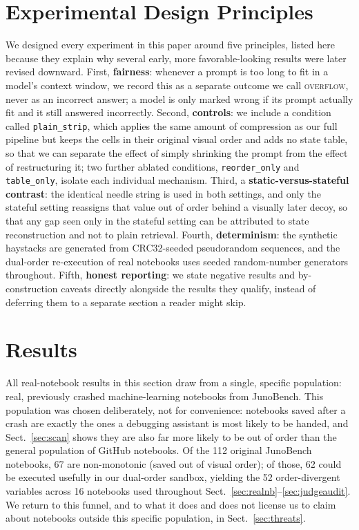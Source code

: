\documentclass[11pt]{article}
\begin{document}
\section{Experimental Design Principles}
We designed every experiment in this paper around five principles, listed
here because they explain why several early, more favorable-looking
results were later revised downward. First, \textbf{fairness}: whenever a
prompt is too long to fit in a model's context window, we record this as
a separate outcome we call \textsc{overflow}, never as an incorrect
answer; a model is only marked wrong if its prompt actually fit and it
still answered incorrectly. Second, \textbf{controls}: we include a
condition called \texttt{plain\_strip}, which applies the same amount of
compression as our full pipeline but keeps the cells in their original
visual order and adds no state table, so that we can separate the effect
of simply shrinking the prompt from the effect of restructuring it; two
further ablated conditions, \texttt{reorder\_only} and
\texttt{table\_only}, isolate each individual mechanism. Third, a
\textbf{static-versus-stateful contrast}: the identical needle string is
used in both settings, and only the stateful setting reassigns that
value out of order behind a visually later decoy, so that any gap seen
only in the stateful setting can be attributed to state reconstruction
and not to plain retrieval. Fourth, \textbf{determinism}: the
synthetic haystacks are generated from CRC32-seeded pseudorandom
sequences, and the dual-order re-execution of real notebooks uses seeded
random-number generators throughout. Fifth, \textbf{honest reporting}: we
state negative results and by-construction caveats directly alongside the
results they qualify, instead of deferring them to a separate section a
reader might skip.

\section{Results}

All real-notebook results in this section draw from a single, specific
population: real, previously crashed machine-learning notebooks from
JunoBench. This population was chosen deliberately, not for convenience:
notebooks saved after a crash are exactly the ones a debugging assistant
is most likely to be handed, and Sect.~\ref{sec:scan} shows they are also
far more likely to be out of order than the general population of GitHub
notebooks. Of the 112 original JunoBench notebooks, 67 are non-monotonic
(saved out of visual order); of those, 62 could be executed usefully in
our dual-order sandbox, yielding the 52 order-divergent variables across
16 notebooks used throughout Sect.~\ref{sec:realnb}--\ref{sec:judgeaudit}.
We return to this funnel, and to what it does and does not license us to
claim about notebooks outside this specific population, in
Sect.~\ref{sec:threats}.
\end{document}
